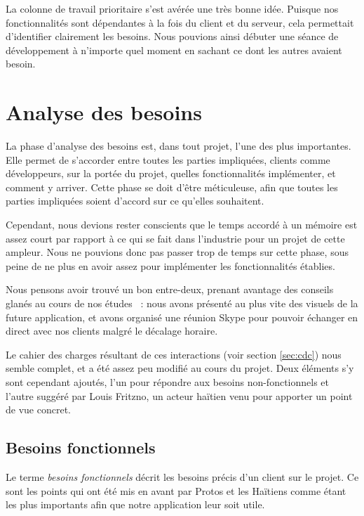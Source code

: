 \documentclass{EPL-master-thesis-covers-FR}
\begin{document}
				La colonne de travail prioritaire s'est avérée une très bonne idée. Puisque nos fonctionnalités sont dépendantes à la fois du client et du serveur, cela permettait d'identifier clairement les besoins. Nous pouvions ainsi débuter une séance de développement à n'importe quel moment en sachant ce dont les autres avaient besoin.

	\chapter{Analyse des besoins}

		\label{sec:analyse_besoins}

		La phase d'analyse des besoins est, dans tout projet, l'une des plus importantes. Elle permet de s'accorder entre toutes les parties impliquées, clients comme développeurs, sur la portée du projet, quelles fonctionnalités implémenter, et comment y arriver. Cette phase se doit d'être méticuleuse, afin que toutes les parties impliquées soient d'accord sur ce qu'elles souhaitent.

		Cependant, nous devions rester conscients que le temps accordé à un mémoire est assez court par rapport à ce qui se fait dans l'industrie pour un projet de cette ampleur. Nous ne pouvions donc pas passer trop de temps sur cette phase, sous peine de ne plus en avoir assez pour implémenter les fonctionnalités établies.

		Nous pensons avoir trouvé un bon entre-deux, prenant avantage des conseils glanés au cours de nos études~\cite{ref:kim_coo} : nous avons présenté au plus vite des visuels de la future application, et avons organisé une réunion Skype pour pouvoir échanger en direct avec nos clients malgré le décalage horaire.

		Le cahier des charges résultant de ces interactions (voir section \ref{sec:cdc}) nous semble complet, et a été assez peu modifié au cours du projet. Deux éléments s'y sont cependant ajoutés, l'un pour répondre aux besoins non-fonctionnels et l'autre suggéré par Louis Fritzno, un acteur haïtien venu pour apporter un point de vue concret.

		\section{Besoins fonctionnels}

			Le terme \emph{besoins fonctionnels} décrit les besoins précis d'un client sur le projet. Ce sont les points qui ont été mis en avant par Protos et les Haïtiens comme étant les plus importants afin que notre application leur soit utile.
\end{document}
